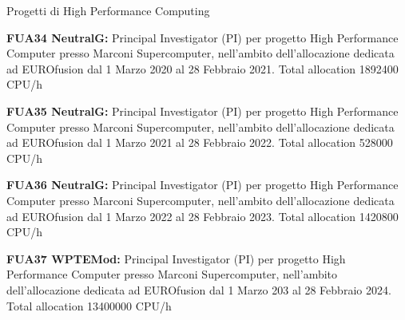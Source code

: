 \begin{statementblock}{Progetti di High Performance Computing}
\end{statementblock}
\begin{enumerate}[label={[R\arabic*]}]
\item \textbf{FUA34 NeutralG:}  Principal Investigator (PI) per
  progetto High Performance Computer presso Marconi Supercomputer,
  nell'ambito dell'allocazione dedicata ad EUROfusion dal 1 Marzo 2020
  al 28 Febbraio 2021. Total allocation 1892400 CPU/h
   
\item \textbf{FUA35 NeutralG:}  Principal Investigator (PI) per
  progetto High Performance Computer presso Marconi Supercomputer,
  nell'ambito dell'allocazione dedicata ad EUROfusion dal 1 Marzo 2021
  al 28 Febbraio 2022. Total allocation 528000 CPU/h

  \item \textbf{FUA36 NeutralG:}  Principal Investigator (PI) per
  progetto High Performance Computer presso Marconi Supercomputer,
  nell'ambito dell'allocazione dedicata ad EUROfusion dal 1 Marzo 2022
  al 28 Febbraio 2023. Total allocation 1420800 CPU/h

 \item \textbf{FUA37 WPTEMod:}  Principal Investigator (PI) per
  progetto High Performance Computer presso Marconi Supercomputer,
  nell'ambito dell'allocazione dedicata ad EUROfusion dal 1 Marzo 203
  al 28 Febbraio 2024. Total allocation 13400000 CPU/h




\end{enumerate}

